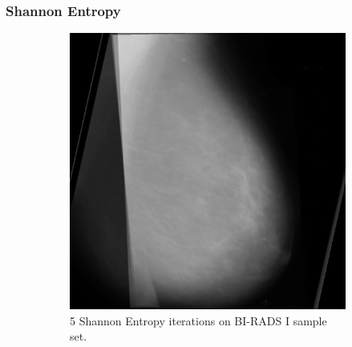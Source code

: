 \newpage
\subsubsection{Shannon Entropy}

\begin{figure}[H]
    \centering
    \begin{subfigure}[t]{0.3\textwidth}
        \includegraphics[width=\textwidth]{Chapter3/shannon-img/s-5-final.png}
        \caption{5 Shannon Entropy iterations on BI-RADS I sample set.}
        \label{fig:5-shannon}
    \end{subfigure} \hfill
    ~ %
    \begin{subfigure}[t]{0.3\textwidth}

\end{subfigure}
\end{figure}
